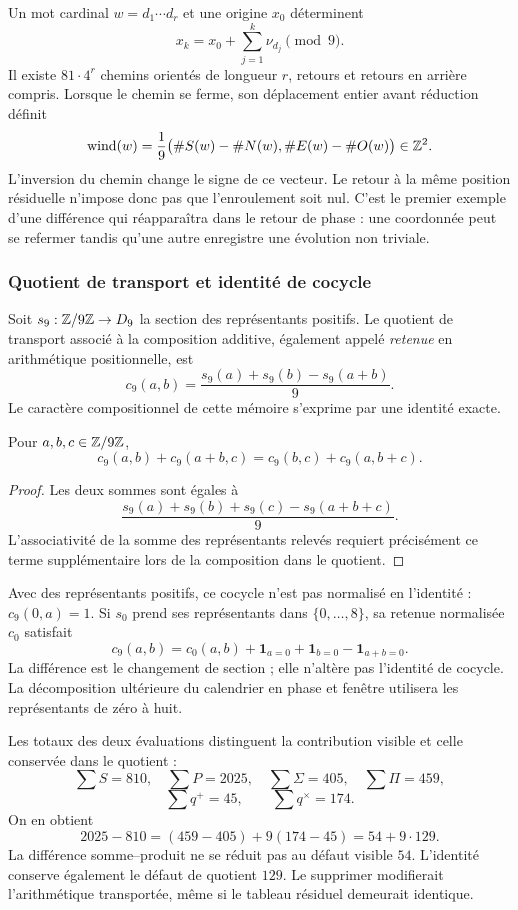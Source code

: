 Un mot cardinal \(w=d_1\cdots d_r\) et une origine \(x_0\) déterminent
\[
 x_k=x_0+\sum_{j=1}^k\nu_{d_j}\pmod9.
\]
Il existe \(81\cdot4^r\) chemins orientés de longueur \(r\), retours et retours en arrière compris. Lorsque le chemin se ferme, son déplacement entier avant réduction définit
\begin{equation}
 \operatorname{wind}(w)=\frac19
 \bigl(\#S(w)-\#N(w),\#E(w)-\#O(w)\bigr)\in\mathbb Z^2.
\end{equation}
L'inversion du chemin change le signe de ce vecteur. Le retour à la même position résiduelle n'impose donc pas que l'enroulement soit nul. C'est le premier exemple d'une différence qui réapparaîtra dans le retour de phase : une coordonnée peut se refermer tandis qu'une autre enregistre une évolution non triviale.

\subsubsection{Quotient de transport et identité de cocycle}

Soit \(s_9:\mathbb Z/9\mathbb Z\to D_9\) la section des représentants positifs. Le quotient de transport associé à la composition additive, également appelé \emph{retenue} en arithmétique positionnelle, est
\[
 c_9(a,b)=\frac{s_9(a)+s_9(b)-s_9(a+b)}9.
\]
Le caractère compositionnel de cette mémoire s'exprime par une identité exacte.

\begin{lemma}
Pour \(a,b,c\in\mathbb Z/9\mathbb Z\),
\[
 c_9(a,b)+c_9(a+b,c)=c_9(b,c)+c_9(a,b+c).
\]
\end{lemma}
\begin{proof}
Les deux sommes sont égales à
\[
 \frac{s_9(a)+s_9(b)+s_9(c)-s_9(a+b+c)}9.
\]
L'associativité de la somme des représentants relevés requiert précisément ce terme supplémentaire lors de la composition dans le quotient.
\end{proof}

Avec des représentants positifs, ce cocycle n'est pas normalisé en l'identité : \(c_9(0,a)=1\). Si \(s_0\) prend ses représentants dans \(\{0,\ldots,8\}\), sa retenue normalisée \(c_0\) satisfait
\[
 c_9(a,b)=c_0(a,b)+\mathbf1_{a=0}+\mathbf1_{b=0}-\mathbf1_{a+b=0}.
\]
La différence est le changement de section ; elle n'altère pas l'identité de cocycle. La décomposition ultérieure du calendrier en phase et fenêtre utilisera les représentants de zéro à huit.

Les totaux des deux évaluations distinguent la contribution visible et celle conservée dans le quotient :
\[
 \sum S=810,\quad\sum P=2025,\quad
 \sum\Sigma=405,\quad\sum\Pi=459,
\]
\[
 \sum q^+=45,\qquad\sum q^\times=174.
\]
On en obtient
\begin{equation}
 2025-810=(459-405)+9(174-45)=54+9\cdot129.
 \label{eq:defecto-integrado}
\end{equation}
La différence somme--produit ne se réduit pas au défaut visible \(54\). L'identité conserve également le défaut de quotient \(129\). Le supprimer modifierait l'arithmétique transportée, même si le tableau résiduel demeurait identique.

